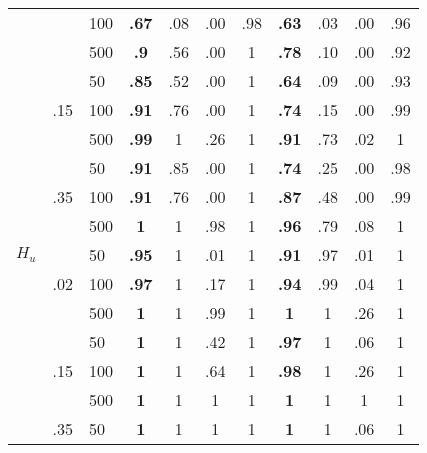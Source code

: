 \documentclass[11pt, a4paper]{article} %
\begin{document}
\begin{table}[H]
\begin{tabular}{lllcccccccc}
		&                           & 100                     & \textbf{.67}   & .08   & .00   & .98  & \textbf{.63}    & .03    & .00   & .96   \\
		&                           & 500                     & \textbf{.9}    & .56   & .00   & 1    & \textbf{.78}    & .10    & .00   & .92   \\
		& \multirow{3}{*}{.15}      & 50                      & \textbf{.85}   & .52   & .00   & 1    & \textbf{.64}    & .09    & .00   & .93   \\
		&                           & 100                     & \textbf{.91}   & .76   & .00   & 1    & \textbf{.74}    & .15    & .00   & .99   \\
		&                           & 500                     & \textbf{.99}   & 1     & .26   & 1    & \textbf{.91}    & .73    & .02   & 1     \\
		& \multirow{3}{*}{.35}      & 50                      & \textbf{.91}   & .85   & .00   & 1    & \textbf{.74}    & .25    & .00   & .98   \\
		&                           & 100                     & \textbf{.91}   & .76   & .00   & 1    & \textbf{.87}    & .48    & .00   & .99   \\
		&                           & 500                     & \textbf{1}     & 1     & .98   & 1    & \textbf{.96}    & .79    & .08   & 1     \\ \hline
		$H_u$ & \multirow{3}{*}{.02}      & 50                      & \textbf{.95}   & 1     & .01   & 1    & \textbf{.91}    & .97    & .01   & 1     \\
		&                           & 100                     & \textbf{.97}   & 1     & .17   & 1    & \textbf{.94}    & .99    & .04   & 1     \\
		&                           & 500                     & \textbf{1}     & 1     & .99   & 1    & \textbf{1}      & 1      & .26   & 1     \\
		& \multirow{3}{*}{.15}      & 50                      & \textbf{1}     & 1     & .42   & 1    & \textbf{.97}    & 1      & .06   & 1     \\
		&                           & 100                     & \textbf{1}     & 1     & .64   & 1    & \textbf{.98}    & 1      & .26   & 1     \\
		&                           & 500                     & \textbf{1}     & 1     & 1     & 1    & \textbf{1}      & 1      & 1     & 1     \\
		& \multirow{3}{*}{.35}      & 50                      & \textbf{1}     & 1     & 1     & 1    & \textbf{1}      & 1      & .06   & 1     \\

\end{tabular}
\end{table}
\end{document}
